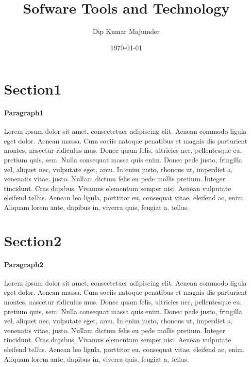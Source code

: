 \documentclass{article}
\title{Sofware Tools and Technology}
\author{Dip Kumar Majumder}
\date{\today}
\begin{document}
\maketitle

\thispagestyle{fancy}

\section{Section1}
\paragraph{Paragraph1}
Lorem ipsum dolor sit amet, consectetuer adipiscing elit. Aenean commodo ligula eget dolor. Aenean massa. Cum sociis natoque penatibus et magnis dis parturient montes, nascetur ridiculus mus. Donec quam felis, ultricies nec, pellentesque eu, pretium quis, sem. Nulla consequat massa quis enim. Donec pede justo, fringilla vel, aliquet nec, vulputate eget, arcu. In enim justo, rhoncus ut, imperdiet a, venenatis vitae, justo. Nullam dictum felis eu pede mollis pretium. Integer tincidunt. Cras dapibus. Vivamus elementum semper nisi. Aenean vulputate eleifend tellus. Aenean leo ligula, porttitor eu, consequat vitae, eleifend ac, enim. Aliquam lorem ante, dapibus in, viverra quis, feugiat a, tellus.

\section{Section2}
\paragraph{Paragraph2}
Lorem ipsum dolor sit amet, consectetuer adipiscing elit. Aenean commodo ligula eget dolor. Aenean massa. Cum sociis natoque penatibus et magnis dis parturient montes, nascetur ridiculus mus. Donec quam felis, ultricies nec, pellentesque eu, pretium quis, sem. Nulla consequat massa quis enim. Donec pede justo, fringilla vel, aliquet nec, vulputate eget, arcu. In enim justo, rhoncus ut, imperdiet a, venenatis vitae, justo. Nullam dictum felis eu pede mollis pretium. Integer tincidunt. Cras dapibus. Vivamus elementum semper nisi. Aenean vulputate eleifend tellus. Aenean leo ligula, porttitor eu, consequat vitae, eleifend ac, enim. Aliquam lorem ante, dapibus in, viverra quis, feugiat a, tellus.
\end{document}
